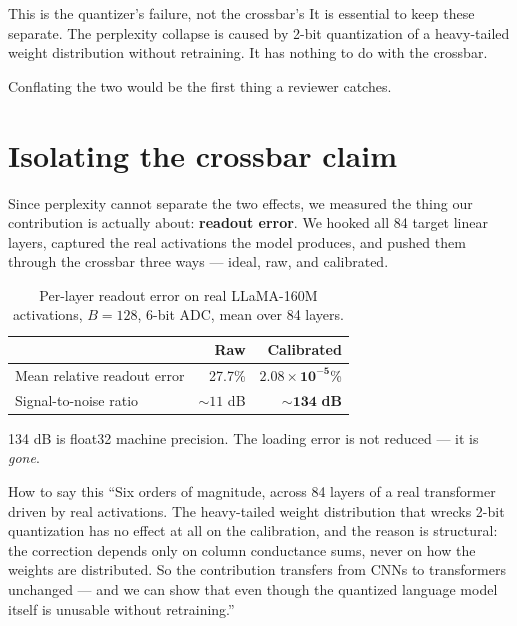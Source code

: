 \documentclass[11pt,a4paper]{report}
\begin{document}
\begin{keybox}{This is the quantizer's failure, not the crossbar's}
It is essential to keep these separate. The perplexity collapse is caused by
2-bit quantization of a heavy-tailed weight distribution without retraining.
It has nothing to do with the crossbar.

Conflating the two would be the first thing a reviewer catches.
\end{keybox}

\section{Isolating the crossbar claim}

Since perplexity cannot separate the two effects, we measured the thing our
contribution is actually about: \textbf{readout error}. We hooked all 84
target linear layers, captured the real activations the model produces, and
pushed them through the crossbar three ways --- ideal, raw, and calibrated.

\begin{table}[h]
\centering
\caption{Per-layer readout error on real LLaMA-160M activations, $B = 128$,
6-bit ADC, mean over 84 layers.}
\begin{tabular}{lrr}
\toprule
 & Raw & \textbf{Calibrated} \\
\midrule
Mean relative readout error & 27.7\% & $\mathbf{2.08\times10^{-5}}$\% \\
Signal-to-noise ratio & ${\sim}11$ dB & $\mathbf{{\sim}134}$ \textbf{dB} \\
\bottomrule
\end{tabular}
\end{table}

134 dB is float32 machine precision. The loading error is not reduced --- it
is \emph{gone}.

\begin{saybox}{How to say this}
``Six orders of magnitude, across 84 layers of a real transformer driven by
real activations. The heavy-tailed weight distribution that wrecks 2-bit
quantization has no effect at all on the calibration, and the reason is
structural: the correction depends only on column conductance sums, never on
how the weights are distributed. So the contribution transfers from CNNs to
transformers unchanged --- and we can show that even though the quantized
language model itself is unusable without retraining.''
\end{saybox}
\end{document}
